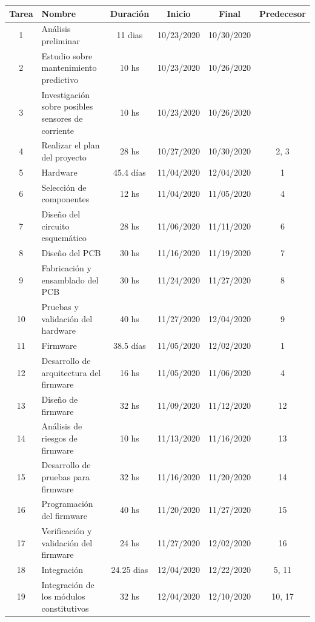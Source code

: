 \documentclass[11pt]{charter}
\begin{document}
\begin{table}[htpb]
\centering
\begin{tabularx}{\linewidth}{@{}|c|X|c|c|c|c|@{}}
\hline
\rowcolor[HTML]{C0C0C0} 
Tarea & Nombre & Duración & Inicio & Final & Predecesor \\ \hline
1 & Análisis preliminar & 11 dias &  10/23/2020 & 10/30/2020 & \\ \hline
2 & Estudio sobre mantenimiento predictivo &  10 hs & 10/23/2020 & 	10/26/2020	 &\\ \hline
3 & Investigación sobre posibles sensores de corriente &  10 hs & 10/23/2020 & 10/26/2020	 & \\ \hline
4 & Realizar el plan del proyecto &  28 hs & 10/27/2020 & 	10/30/2020 & 2, 3 \\ \hline		
5 & Hardware &  45.4 días & 11/04/2020 & 	12/04/2020 & 1\\ \hline
6 & Selección de componentes &  12 hs & 11/04/2020 & 	11/05/2020 & 4\\ \hline
7 & Diseño del circuito esquemático &  28 hs & 11/06/2020 & 	11/11/2020	 &6\\ \hline
8 & Diseño del PCB &  30 hs & 11/16/2020 & 	11/19/2020 &7\\ \hline
9 & Fabricación y ensamblado del PCB &  30 hs & 11/24/2020 & 	11/27/2020	 & 8\\ \hline
10 & Pruebas y validación del hardware &  40 hs & 11/27/2020 & 	12/04/2020	 & 9	\\ \hline
11 & Firmware &  38.5 días &11/05/2020	 & 12/02/2020 &  1\\ \hline
12 & Desarrollo de arquitectura del firmware &   16 hs & 11/05/2020 & 	11/06/2020 & 4\\ \hline
13 & Diseño de firmware &  32 hs & 11/09/2020 & 	11/12/2020 & 12\\ \hline
14 & Análisis de riesgos de firmware &  10 hs & 11/13/2020 & 	11/16/2020 & 13\\ \hline
15 & Desarrollo de pruebas para firmware &  32 hs & 11/16/2020 & 	11/20/2020 & 14\\ \hline
16 & Programación del firmware &  40 hs & 11/20/2020 & 	11/27/2020 & 15\\ \hline
17 & Verificación y validación del firmware  & 24 hs &11/27/2020 & 	12/02/2020 & 16 \\ \hline
18 & Integración &  24.25 dias & 12/04/2020 & 	12/22/2020 &5, 11\\ \hline
19 & Integración de los módulos constitutivos &  32 hs & 12/04/2020 & 	12/10/2020 & 10, 17\\ \hline

\end{tabularx}
\end{table}
\end{document}

